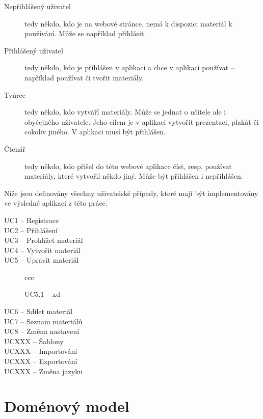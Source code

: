 \begin{description}
    \item[Nepřihlášený uživatel] tedy někdo, kdo je na webové stránce, nemá k dispozici materiál k používání. Může se například přihlásit.
    \item[Přihlášený uživatel] tedy někdo, kdo je přihlášen v aplikaci a chce v aplikaci používat -- například používat či tvořit materiály.
    \item[Tvůrce] tedy někdo, kdo vytváří materiály. Může se jednat o učitele ale i obyčejného uživatele. Jeho cílem je v aplikaci vytvořit prezentaci, plakát či cokoliv jiného. V aplikaci musí být přihlášen.
    \item[Čtenář] tedy někdo, kdo přišel do této webové aplikace číst, resp. používat materiály, které vytvořil někdo jiný. Může být přihlášen i nepřihlášen.
\end{description}

Níže jsou definovány všechny uživatelské případy, které mají být implementovány ve výsledné aplikaci z této práce.

\begin{description}
    \item[UC1 -- Registrace]
    \item[UC2 -- Přihlášení]
    \item[UC3 -- Prohlížet materiál] 
    \item[UC4 -- Vytvořit materiál]
    \item[UC5 -- Upravit materiál] ccc
        \begin{description}
            \item[UC5.1 -- xd] 
        \end{description}
    \item[UC6 -- Sdílet materiál]
    \item[UC7 -- Seznam materiálů] 
    \item[UC8 -- Změna nastavení]
    
    
    \item[UCXXX -- Šablony]
    \item[UCXXX -- Importování]
    \item[UCXXX -- Exportování]
    \item[UCXXX -- Změna jazyku]
\end{description}

\section{Doménový model}